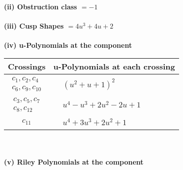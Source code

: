 \documentclass[1p]{elsarticle_modified}
\theoremstyle{definition}
\begin{document}
\flushleft \textbf{(ii) Obstruction class $= -1$}\\~\\
\flushleft \textbf{(iii) Cusp Shapes $= 4 u^3+4 u+2$}\\~\\
\newpage\renewcommand{\arraystretch}{1}
\flushleft \textbf{(iv) u-Polynomials at the component}\newline \\
\begin{tabular}{m{50pt}|m{274pt}}
Crossings & \hspace{64pt}u-Polynomials at each crossing \\
\hline $$\begin{aligned}c_{1},c_{2},c_{4}\\c_{6},c_{9},c_{10}\end{aligned}$$&$\begin{aligned}
&(u^2+u+1)^2
\end{aligned}$\\
\hline $$\begin{aligned}c_{3},c_{5},c_{7}\\c_{8},c_{12}\end{aligned}$$&$\begin{aligned}
&u^4- u^3+2 u^2-2 u+1
\end{aligned}$\\
\hline $$\begin{aligned}c_{11}\end{aligned}$$&$\begin{aligned}
&u^4+3 u^3+2 u^2+1
\end{aligned}$\\
\hline
\end{tabular}\\~\\
\newpage\renewcommand{\arraystretch}{1}
\flushleft \textbf{(v) Riley Polynomials at the component}\newline \\
\end{document}
